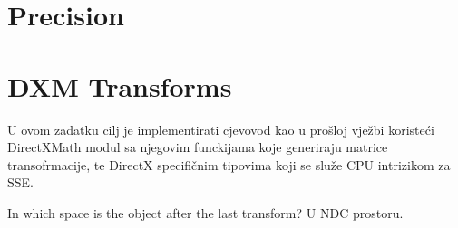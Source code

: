 \pagebreak

\section{Precision}
\label{sec:prec}
\setcounter{lstlisting}{0}

\begin{codesection}
	
\end{codesection}

\pagebreak

\section{DXM Transforms}
\label{sec:tf}
\setcounter{lstlisting}{0}

U ovom zadatku cilj je implementirati cjevovod kao u prošloj vježbi koristeći DirectXMath modul sa njegovim funckijama koje generiraju matrice transofrmacije, te DirectX specifičnim tipovima koji se služe CPU intrizikom za SSE.

\begin{codelisting}
	
\end{codelisting}

\QandA
{In which space is the object after the last transform?}
{U NDC prostoru.}

\begin{codelisting}
	
\end{codelisting}

\pagebreak

\begin{codesection}
	
\end{codesection}

\pagebreak


